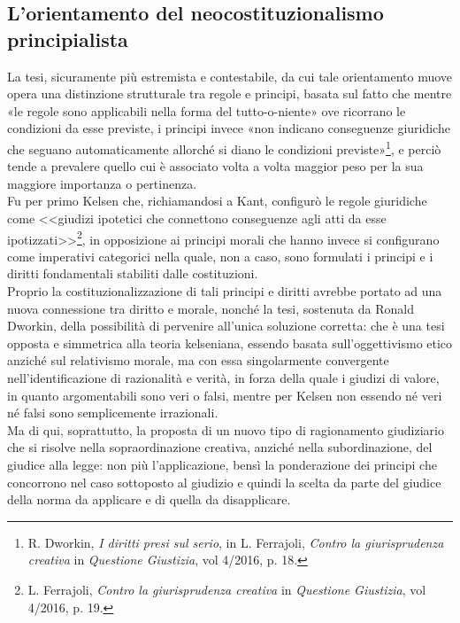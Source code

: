 \subsection{L'orientamento del neocostituzionalismo principialista}
La tesi, sicuramente più estremista e contestabile, da cui tale orientamento muove opera una distinzione strutturale tra regole e principi, basata sul fatto che mentre «le regole sono applicabili nella forma del tutto-o-niente» ove ricorrano le condizioni da esse previste, i principi invece «non indicano conseguenze giuridiche che seguano automaticamente allorché si diano le condizioni previste»\footnote{R. Dworkin, \textit{I diritti presi sul serio}, in L. Ferrajoli, \textit{Contro la giurisprudenza creativa} in \textit{Questione Giustizia}, vol 4/2016, p. 18.}, e perciò tende a prevalere quello cui è associato volta a volta maggior peso per la sua maggiore importanza o pertinenza.
\\Fu per primo Kelsen che, richiamandosi a Kant, configurò le regole giuridiche come <<giudizi ipotetici che connettono conseguenze agli atti da esse ipotizzati>>\footnote{L. Ferrajoli, \textit{Contro la giurisprudenza creativa} in \textit{Questione Giustizia}, vol 4/2016, p. 19.}, in opposizione ai principi morali che hanno invece si configurano come imperativi categorici nella quale, non a caso, sono formulati i principi e i diritti fondamentali stabiliti dalle costituzioni. 
\\Proprio la costituzionalizzazione di tali principi e diritti avrebbe portato ad una nuova connessione tra diritto e morale, nonché la tesi, sostenuta da Ronald Dworkin, della possibilità di pervenire all’unica soluzione corretta: che è una tesi opposta e simmetrica alla teoria kelseniana, essendo basata sull’oggettivismo etico anziché sul relativismo morale, ma con essa singolarmente convergente nell’identificazione di razionalità e verità, in forza della quale i giudizi di valore, in quanto argomentabili sono veri o falsi, mentre per Kelsen non essendo né veri né falsi sono semplicemente irrazionali. 
\\Ma di qui, soprattutto, la proposta di un nuovo tipo di ragionamento giudiziario che si risolve nella sopraordinazione creativa, anziché nella subordinazione, del giudice alla legge: non più l’applicazione, bensì la ponderazione dei principi che concorrono nel caso sottoposto al giudizio e quindi la scelta da parte del giudice della norma da applicare e di quella da disapplicare.

